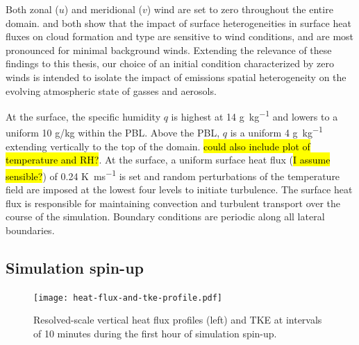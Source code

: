 Both zonal ($u$) and meridional ($v$) wind are set to zero throughout the entire domain. \cite{tian_how_2022} and \cite{fast_impact_2019} both show that the impact of surface heterogeneities in surface heat fluxes on cloud formation and type are sensitive to wind conditions, and are most pronounced for minimal background winds. Extending the relevance of these findings to this thesis, our choice of an initial condition characterized by zero winds is intended to isolate the impact of emissions spatial heterogeneity on the evolving atmospheric state of gasses and aerosols.

At the surface, the specific humidity $q$ is highest at 14 \si{g.kg^{-1}} and lowers to a uniform 10 g/kg within the PBL. Above the PBL, $q$ is a uniform 4 \si{g.kg^{-1}} extending vertically to the top of the domain. \hl{could also include plot of temperature and RH?}. At the surface, a uniform surface heat flux (\hl{I assume sensible?}) of 0.24 \si{K.ms^{-1}} is set and random perturbations of the temperature field are imposed at the lowest four levels to initiate turbulence. The surface heat flux is responsible for maintaining convection and turbulent transport over the course of the simulation. Boundary conditions are periodic along all lateral boundaries.

\subsection{Simulation spin-up}

\begin{figure}[h]
	\centering
	\texttt{[image: heat-flux-and-tke-profile.pdf]}
	\caption{Resolved-scale vertical heat flux profiles (left) and TKE at intervals of 10 minutes during the first hour of simulation spin-up.}
	\label{fig:heat-flux}
\end{figure}

